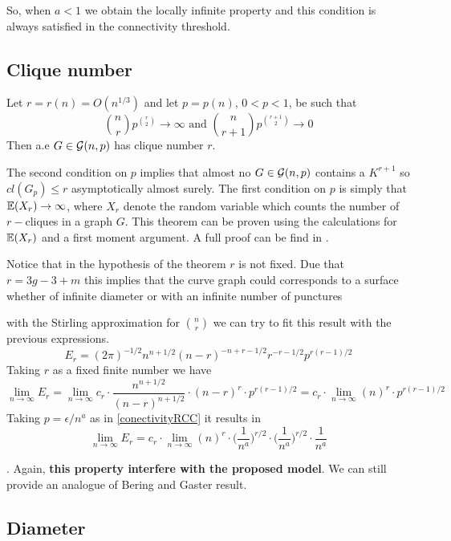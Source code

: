 So, when $a<1$ we obtain the locally infinite property and this condition is always satisfied in the connectivity threshold.

\subsection{Clique number}

\begin{theorem}
Let $r = r(n) = O(n^{1/3})$ and let $p=p(n)$, $0<p<1$, be such that
$$\binom{n}{r} p^{\binom{r}{2}} \to \infty \text{ and } \binom{n}{r+1} p^{\binom{r+1}{2}} \to 0 $$
Then a.e $G\in\mathcal{G}(n,p)$ has clique number $r$.
\end{theorem}

The second condition on $p$ implies that almost no $G\in\mathcal{G}(n,p)$ contains a $K^{r+1}$ so $cl(G_{p})\leq r$ asymptotically almost surely. The first condition on $p$ is simply that $\mathbb{E} (X_{r}) \to  \infty$, where $X_r$ denote the random variable which counts the number of $r-$cliques in a graph $G$. This theorem can be proven using the calculations for $\mathbb{E}(X_{r})$ and a first moment argument. A full proof can be find in \cite[Bollobás, p.~290]{Bollobas}.

Notice that in the hypothesis of the theorem $r$ is not fixed. Due that $r=3g-3+m$ this implies that the curve graph could corresponds to a surface whether of infinite diameter or with an infinite number of punctures

with the Stirling approximation for $\binom{n}{r}$ we can try to fit this result with the previous expressions.
$$E_{r} = (2\pi)^{- 1/2} n^{n+ 1/2} (n - r)^{-n+r-1/2} r^{-r-1/2} p^{r(r- 1)/2}$$
Taking $r$ as a fixed finite number we have
$$\displaystyle\lim_{n\to \infty } E_{r} = \displaystyle\lim_{n\to \infty} c_{r}\cdot \frac{n^{n+1/2}}{(n-r)^{n+1/2}} \cdot (n-r)^{r}\cdot p^{r(r-1)/2} = c_{r}\cdot \displaystyle\lim_{n\to \infty}  (n)^{r}\cdot p^{r(r-1)/2}$$
Taking $p=\epsilon/n^{a}$ as in \ref{conectivityRCC} it results in
$$\displaystyle\lim_{n\to \infty } E_{r} =  c_{r}\cdot \displaystyle\lim_{n\to \infty}  (n)^{r}\cdot\Big(\frac{1}{n^a}\Big)^{r/2}\cdot \Big(\frac{1}{n^a}\Big)^{r/2}
\cdot\frac{1}{n^a}$$



. Again, \textbf{this property interfere with the proposed model}. We can still provide an analogue of Bering and Gaster result.

\subsection{Diameter}


